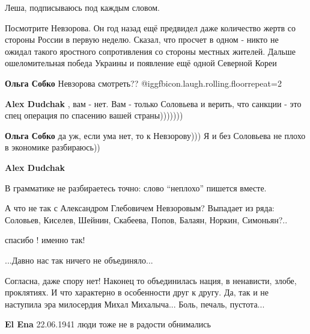  
 
 
 
 
\zzSecCmt

\begin{itemize} %
Леша, подписываюсь под каждым словом.


Посмотрите Невзорова. Он год назад ещё предвидел даже количество жертв со
стороны России в первую неделю. Сказал, что просчет в одном - никто не ожидал
такого яростного сопротивления со стороны местных жителей. Дальше
ошеломительная победа Украины и появление ещё одной Северной Кореи

\begin{itemize} %
\textbf{Ольга Собко} Невзорова смотреть??  @igg{fbicon.laugh.rolling.floor}{repeat=2} 

\textbf{Alex Dudchak} , вам - нет. Вам - только Соловьева и верить, что санкции - это спец операция по спасению вашей страны)))))))

\textbf{Ольга Собко} да уж, если ума нет, то к Невзорову))) Я и без Соловьева не плохо в экономике разбираюсь))

\textbf{Alex Dudchak} 

В грамматике не разбираетесь точно: слово \enquote{неплохо} пишется вместе.

А что не так с Александром Глебовичем Невзоровым? Выпадает из ряда: Соловьев,
Киселев, Шейнин, Скабеева, Попов, Балаян, Норкин, Симоньян?..

\end{itemize} %

спасибо ! именно так!


...Давно нас так ничего не объединяло...

Согласна, даже спору нет! Наконец то объединилась нация, в ненависти, злобе,
проклятиях. И что характерно в особенности друг к другу. Да, так и не наступила
эра милосердия Михал Михалыча... Боль, печаль, пустота...

\begin{itemize} %
\textbf{El Ena} 22.06.1941 люди тоже не в радости обнимались


\end{itemize}
\end{itemize}
